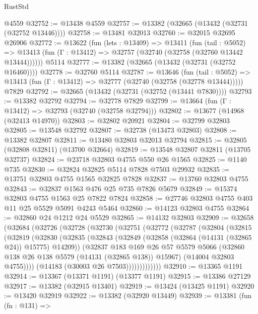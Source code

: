 \begin{lexlean}{RustStd}
\begin{coremodule}
    @4559
@32752 := @13438 @4559
@32757 := @13382 (@32665 (@13432 (@32731 (@32752 @13446))))
@32758 := @13481 @32013
@32760 := @32015 @32695 @26906
@32772 := @13622
    (fun (lets : @13409) =>
    @13411
      (fun (tail : @5052) =>
      @13413 (fun (Γ : @13412) => @32757 (@32740 (@32758 (@32760 @13442 @13444))))))
    @5114
@32777 := @13382 (@32665 (@13432 (@32731 (@32752 @16460))))
@32778 := @32760 @5114
@32787 := @13646
    (fun (tail : @5052) => @13413 (fun (Γ : @13412) => @32777 (@32740 (@32758 (@32778 @13444)))))
    @7829
@32792 := @32665 (@13432 (@32731 (@32752 (@13441 @7830))))
@32793 := @13382 @32792
@32794 := @32778 @7829
@32799 := @13664 (fun (Γ : @13412) => @32793 (@32740 (@32758 @32794)))
@32802 := @13677 (@14968 (@32413 @14970))
@32803 := @32802 @20921
@32804 := @32799 @32803
@32805 := @13548 @32792
@32807 := @32738 (@13473 @32803)
@32808 := @13382 @32807
@32811 := @13480 @32803 @32013 @32794
@32815 := @32805 (@32808 @32811) (@13700 @32664)
@32819 := @13548 @32807 @32811 (@13705 @32737)
@32824 := @23718 @32803 @4755 @550 @26 @1565
@32825 := @1140 @735
@32830 := @32824 @32825 @5114 @7828 @7503 @29932
@32835 := @13751 @32803 @4755 @1565 @32825 @7828
@32837 := @13760 @32803 @4755
@32843 := @32837 @1563 @476 @25 @735 @7826 @5679
@32849 := @15374 @32803 @4755 @1563 @25 @7822 @7824
@32858 := @27746 @32803 @4755 @403 @11 @25 @5529 @5091 @4243 @5464
@32860 := @14123 @32803 @4755
@32864 := @32860 @24 @1212 @24 @5529
@32865 := @14132 @32803
@32909 := @32658
    (@32684
      (@32726
        (@32728
          (@32730
            (@32751
              (@32772
                (@32787
                  (@32804
                    (@32815
                      (@32819
                        (@32830
                          (@32835
                            (@32843
                              (@32849 (@32858 (@32864 (@14131 (@32865 @24)) @15775) @14209))
                              (@32837
                                @183
                                @169
                                @26
                                @57
                                @5579
                                @5066
                                (@32860 @138 @26 @138 @5579 (@14131 (@32865 @138)) @15967)
                                (@14004 @32803 @4755))))
                          (@14183 (@30003 @26 @7503)))))))))))))
@32910 := @13365 @1191
@32914 := @13367 (@13371 @1191) (@13377 @1191)
@32915 := @13386 @27129
@32917 := @13382 (@32915 @13401)
@32919 := @13424 (@13425 @1191)
@32920 := @13420 @32919
@32922 := @13382 (@32920 @13449)
@32939 := @13381
    (fun (fn : @131) =>

\end{coremodule}
\end{lexlean}
